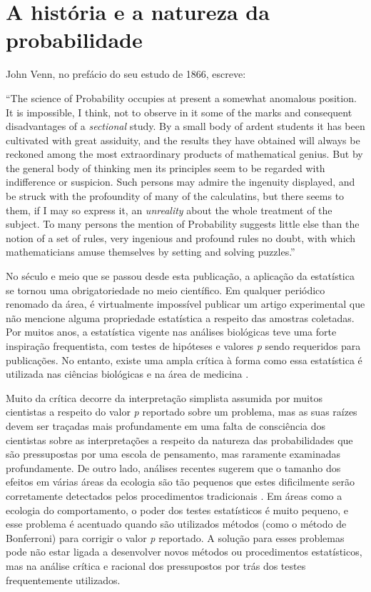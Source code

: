 \section{A história e a natureza da probabilidade}

John Venn, no prefácio do seu estudo de 1866, escreve:

``The science of Probability occupies at present a somewhat anomalous position. It is impossible, I think, not to observe
in it some of the marks and consequent disadvantages of a {\em sectional} study. By a small body of ardent students it
has been cultivated with great assiduity, and the results they have obtained will always be reckoned among the most 
extraordinary products of mathematical genius. But by the general body of thinking men its principles seem to be regarded
with indifference or suspicion. Such persons may admire the ingenuity displayed, and be struck with the profoundity
of many of the calculatins, but there seems to them, if I may so express it, an {\em unreality} about the whole treatment
of the subject. To many persons the mention of Probability suggests little else than the notion of a set of rules, very
ingenious and profound rules no doubt, with which mathematicians amuse themselves by setting and solving puzzles.''
\citep{Venn1866}

No século e meio que se passou desde esta publicação, a aplicação da estatística se tornou uma obrigatoriedade no meio científico.
Em qualquer periódico renomado da área, é virtualmente impossível publicar um artigo experimental que não 
mencione alguma propriedade
estatística a respeito das amostras coletadas. Por muitos anos, a estatística vigente nas análises biológicas teve uma
forte inspiração frequentista, com testes de hipóteses e valores {\em p} sendo requeridos para publicações. 
No entanto, existe uma ampla crítica à forma como essa estatística é
utilizada nas ciências biológicas e na área de medicina \citep{Ioannidis05}.

Muito da crítica decorre da interpretação
simplista assumida por muitos cientistas a respeito do valor {\em p} reportado sobre um problema, mas as suas raízes devem
ser traçadas mais profundamente em uma falta de consciência dos cientistas sobre as interpretações a respeito da natureza
das probabilidades que são pressupostas por uma escola de pensamento, mas raramente examinadas profundamente. 
De outro lado, análises recentes sugerem que o tamanho dos efeitos em várias áreas da ecologia são tão pequenos que estes
dificilmente serão corretamente detectados pelos procedimentos tradicionais \citep{Jennions03}. Em áreas como a ecologia do
comportamento, o poder dos testes estatísticos é muito pequeno, e esse problema é acentuado quando são utilizados métodos
(como o método de Bonferroni) para corrigir o valor {\em p} reportado. A solução para esses problemas pode não estar ligada
a desenvolver novos métodos ou procedimentos estatísticos, mas na análise crítica e racional dos pressupostos por trás
dos testes frequentemente utilizados.


